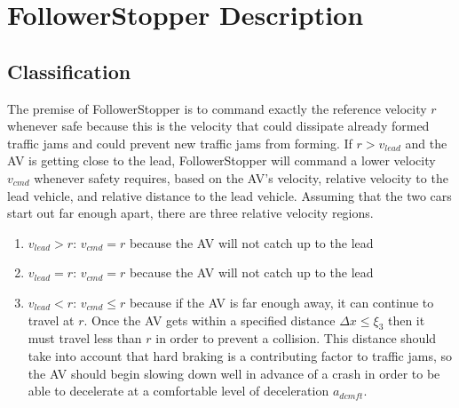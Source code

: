 \documentclass[conference]{IEEEtran}
\begin{document}



\section{FollowerStopper Description}

\subsection{Classification}
The premise of FollowerStopper is to command exactly the reference velocity $r$ whenever safe because this is the velocity that could dissipate already formed traffic jams and could prevent new traffic jams from forming. If $r>v_{lead}$ and the AV is getting close to the lead, FollowerStopper will command a lower velocity $v_{cmd}$ whenever safety requires, based on the AV's velocity, relative velocity to the lead vehicle, and relative distance to the lead vehicle. Assuming that the two cars start out far enough apart, there are three relative velocity regions.
\begin{enumerate}
\item $v_{lead} > r$: $v_{cmd}=r$ because the AV will not catch up to the lead
\item $v_{lead} = r$: $v_{cmd}=r$ because the AV will not catch up to the lead
\item $v_{lead}<r$: $v_{cmd}\leq r$ because if the AV is far enough away, it can continue to travel at $r$. Once the AV gets within a specified distance $\Delta x \leq \xi_3$ then it must travel less than $r$ in order to prevent a collision. This distance should take into account that hard braking is a contributing factor to traffic jams, so the AV should begin slowing down well in advance of a crash in order to be able to decelerate at a comfortable level of deceleration $a_{dcmft}$.
\end{enumerate}
\end{document}
